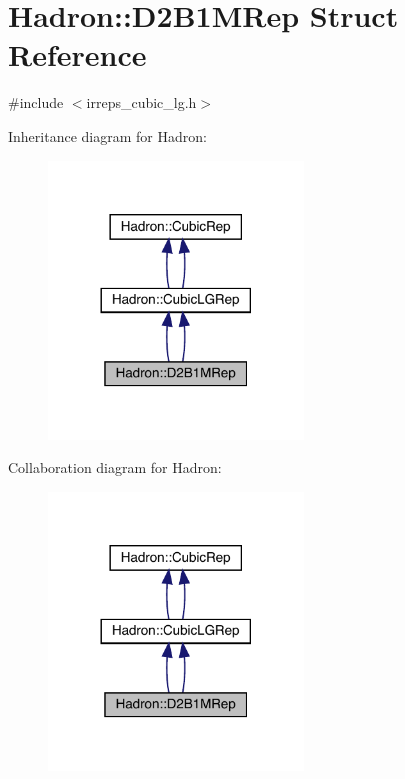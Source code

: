 \hypertarget{structHadron_1_1D2B1MRep}{}\section{Hadron\+:\+:D2\+B1\+M\+Rep Struct Reference}
\label{structHadron_1_1D2B1MRep}


{\ttfamily \#include $<$irreps\+\_\+cubic\+\_\+lg.\+h$>$}



Inheritance diagram for Hadron\+:\nopagebreak
\begin{figure}[H]
\begin{center}
\leavevmode
\includegraphics[width=192pt]{dc/d90/structHadron_1_1D2B1MRep__inherit__graph}
\end{center}
\end{figure}


Collaboration diagram for Hadron\+:\nopagebreak
\begin{figure}[H]
\begin{center}
\leavevmode
\includegraphics[width=192pt]{d9/def/structHadron_1_1D2B1MRep__coll__graph}
\end{center}
\end{figure}
